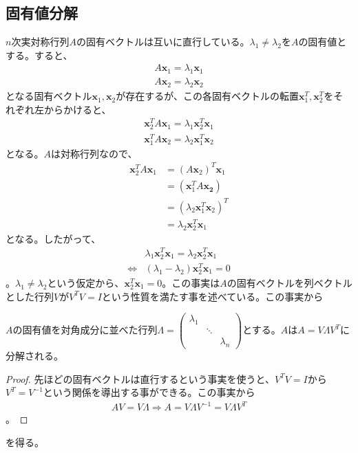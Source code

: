 \subsection{固有値分解}
$n$次実対称行列$A$の固有ベクトルは互いに直行している。$\lambda_1 \not= \lambda_2$を$A$の固有値とする。すると、
\begin{align*}
  A \mathbf{x}_1 = \lambda_1 \mathbf{x}_1 \\
  A \mathbf{x}_2 = \lambda_2 \mathbf{x}_2
\end{align*}
となる固有ベクトル$\mathbf{x}_1, \mathbf{x}_2$が存在するが、この各固有ベクトルの転置$\mathbf{x}_1^T, \mathbf{x}_2^T$をそれぞれ左からかけると、
\begin{align*}
  \mathbf{x}_2^T A \mathbf{x}_1 = \lambda_1 \mathbf{x}_2^T \mathbf{x}_1 \\
  \mathbf{x}_1^T A \mathbf{x}_2 = \lambda_2 \mathbf{x}_1^T \mathbf{x}_2
\end{align*}
となる。$A$は対称行列なので、
\begin{align*}
  \mathbf{x}_2^T A \mathbf{x}_1 & = (A \mathbf{x}_2)^T \mathbf{x}_1 \\
                                & = (\mathbf{x}_1^T A \mathbf{x_2}) \\
                                & = (\lambda_2 \mathbf{x}_1^T \mathbf{x}_2)^T \\
                                & = \lambda_2 \mathbf{x}_2^T \mathbf{x}_1
\end{align*}
となる。したがって、
\begin{align*}
                  & \lambda_1 \mathbf{x}_2^T \mathbf{x}_1 = \lambda_2 \mathbf{x}_2^T \mathbf{x}_1 \\
  \Leftrightarrow & (\lambda_1 - \lambda_2) \mathbf{x}_2^T \mathbf{x}_1 = 0
\end{align*}
。$\lambda_1 \not= \lambda_2$という仮定から、$\mathbf{x}_2^T \mathbf{x}_1 = 0$。この事実は$A$の固有ベクトルを列ベクトルとした行列$V$が$V^T V = I$という性質を満たす事を述べている。この事実から
\begin{theorem*}
  $A$の固有値を対角成分に並べた行列$\Lambda = \displaystyle{\left(\begin{array}{ccc} \lambda_1 & & \\ & \ddots & \\ & & \lambda_n \end{array}\right)}$とする。$A$は$A = V \Lambda V^T$に分解される。
\end{theorem*}
\begin{proof}
  先ほどの固有ベクトルは直行するという事実を使うと、$V^T V = I$から$V^T = V^{-1}$という関係を導出する事ができる。この事実から
  \begin{align*}
    A V = V \Lambda \Rightarrow A = V \Lambda V^{-1} = V \Lambda V^T
  \end{align*}
  。
\end{proof}
を得る。

